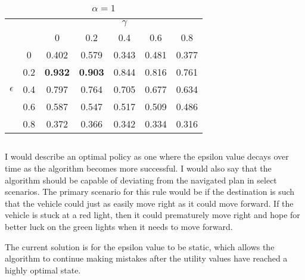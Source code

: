 \documentclass[12pt]{article}
\begin{document}
\vspace{2ex}
\begin{table}[]
\centering
\caption{$\alpha = 1$}
\label{}
\begin{tabular}{|cc|ccccc|}
\hline
            &     &                &                & $\gamma$ &       &       \\ %
            &     & 0              & 0.2            & 0.4      & 0.6   & 0.8   \\ \hline
            & 0   & 0.402          & 0.579          & 0.343    & 0.481 & 0.377 \\ %
            & 0.2 & \textbf{0.932} & \textbf{0.903} & 0.844    & 0.816 & 0.761 \\ %
 $\epsilon$ & 0.4 & 0.797          & 0.764          & 0.705    & 0.677 & 0.634 \\ %
            & 0.6 & 0.587          & 0.547          & 0.517    & 0.509 & 0.486 \\ %
            & 0.8 & 0.372          & 0.366          & 0.342    & 0.334 & 0.316 \\ \hline
\end{tabular}
\end{table}

\subsection{}
I would describe an optimal policy as one where the epsilon value decays over time as the algorithm becomes more successful.
I would also say that the algorithm should be capable of deviating from the navigated plan in select scenarios. 
The primary scenario for this rule would be if the destination is such that the vehicle could just as easily move right as it could move forward.
If the vehicle is stuck at a red light, then it could prematurely move right and hope for better luck on the green lights when it needs to move forward.

The current solution is for the epsilon value to be static, which allows the algorithm to continue making mistakes after the utility values have reached a highly optimal state.
\end{document}
